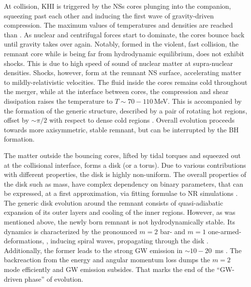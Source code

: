 At collision, \ac{KHI} is triggered by the \acp{NS} cores plunging into the companion,
squeezing past each other and inducing the first wave of gravity-driven compression. 
The maximum values of temperatures and densities are reached than \citep{Perego:2019adq}. 
As nuclear and centrifugal forces start to dominate, the cores bounce back until gravity 
takes over again. %
%
Notably, formed in the violent, fast collision, the remnant core while is being far from 
hydrodynamic equilibrium, does not exhibit shocks. This is due to high speed of sound 
of nuclear matter at supra-nuclear densities.
%
Shocks, however, form at the remnant \ac{NS} surface, accelerating matter to mildly-relativistic 
velocities. %
The fluid inside the cores remains cold 
throughout the merger, while at the interface between cores, the compression and shear 
dissipation raises the temperature to $T\sim70-110\,$MeV.
This is accompanied by the formation of the generic structure, described
by a pair of rotating hot regions, offset by $\sim\pi/2$ with 
respect to dense cold regions \citep{Kastaun:2016yaf}.
%
Overall evolution proceeds towards more axisymmetric, stable remnant, but can be 
interrupted by the \ac{BH} formation. 

The matter outside the bouncing cores, lifted by tidal torques and squeezed out at the 
collisional interface, forms a disk (or a torus).
Due to various contributions with different properties, the disk is highly non-uniform.
The overall properties of the disk such as mass, have complex dependency on 
binary parameters, that can be expressed, at a first approximation, via fitting 
formulae to \ac{NR} simulations \citep{Radice:2017lry,Radice:2018xqa,Radice:2018ozg}. 
The generic disk evolution around the remnant consists of quasi-adiabatic expansion
of its outer layers 
and cooling of the inner regions. 
%
However, as was mentioned above, the newly born remnant is not hydrodynamically stable. 
Its dynamics is characterized by the pronounced $m=2$ bar- and $m=1$ one-armed-
deformations, , inducing spiral waves, propagating through the 
disk .%
Additionally, the former leads to the strong \ac{GW} emission 
in ${\sim}10-20$~ms \pmerg{}. The backreaction from the energy and angular momentum 
loss dumps the $m=2$ mode efficiently and \ac{GW} emission subsides. 
That marks the end of the ``\ac{GW}-driven phase'' of \pmerg{} evolution. 

